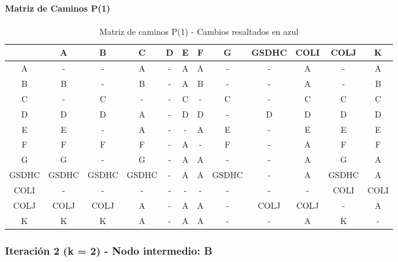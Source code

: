 \documentclass[12pt]{article}
\begin{document}
\paragraph{Matriz de Caminos P(1)}
\begin{table}[h!]
\centering
\begin{tabular}{|c|c|c|c|c|c|c|c|c|c|c|c|}
\hline
 & A & B & C & D & E & F & G & GSDHC & COLI & COLJ & K \\\hline
A & - & - & A & - & A & A & - & - & A & - & A \\\hline
B & B & - & B & - & \cellcolor{lightblue} A & B & - & - & \cellcolor{lightblue} A & - & B \\\hline
C & - & C & - & - & C & - & C & - & C & C & C \\\hline
D & D & D & \cellcolor{lightblue} A & - & D & D & - & D & D & D & D \\\hline
E & E & - & \cellcolor{lightblue} A & - & - & \cellcolor{lightblue} A & E & - & E & E & E \\\hline
F & F & F & F & - & \cellcolor{lightblue} A & - & F & - & \cellcolor{lightblue} A & F & F \\\hline
G & G & - & G & - & \cellcolor{lightblue} A & \cellcolor{lightblue} A & - & - & \cellcolor{lightblue} A & G & \cellcolor{lightblue} A \\\hline
GSDHC & GSDHC & GSDHC & GSDHC & - & \cellcolor{lightblue} A & \cellcolor{lightblue} A & GSDHC & - & \cellcolor{lightblue} A & GSDHC & \cellcolor{lightblue} A \\\hline
COLI & - & - & - & - & - & - & - & - & - & COLI & COLI \\\hline
COLJ & COLJ & COLJ & \cellcolor{lightblue} A & - & \cellcolor{lightblue} A & \cellcolor{lightblue} A & - & COLJ & COLJ & - & \cellcolor{lightblue} A \\\hline
K & K & K & \cellcolor{lightblue} A & - & \cellcolor{lightblue} A & \cellcolor{lightblue} A & - & - & \cellcolor{lightblue} A & K & - \\\hline
\end{tabular}
\caption{Matriz de caminos P(1) - Cambios resaltados en azul}
\end{table}

\subsubsection{Iteración 2 (k = 2) - Nodo intermedio: B}
\end{document}
